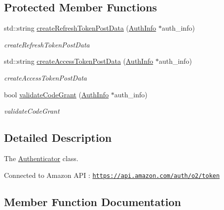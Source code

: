 \subsection*{Protected Member Functions}
\begin{DoxyCompactItemize}
\item 
std\+::string \hyperlink{classAuth_1_1Authenticator_a6b2064f905799b93b0f2bdb78fc99b19}{create\+Refresh\+Token\+Post\+Data} (\hyperlink{classAuth_1_1AuthInfo}{Auth\+Info} $\ast$auth\+\_\+info)
\begin{DoxyCompactList}\small\item\em create\+Refresh\+Token\+Post\+Data \end{DoxyCompactList}\item 
std\+::string \hyperlink{classAuth_1_1Authenticator_a295ebc69cf3ce17cb6ff0b6d8f8e4584}{create\+Access\+Token\+Post\+Data} (\hyperlink{classAuth_1_1AuthInfo}{Auth\+Info} $\ast$auth\+\_\+info)
\begin{DoxyCompactList}\small\item\em create\+Access\+Token\+Post\+Data \end{DoxyCompactList}\item 
bool \hyperlink{classAuth_1_1Authenticator_aeb9ff1428b63189a816d113f1dcdc4f1}{validate\+Code\+Grant} (\hyperlink{classAuth_1_1AuthInfo}{Auth\+Info} $\ast$auth\+\_\+info)
\begin{DoxyCompactList}\small\item\em validate\+Code\+Grant \end{DoxyCompactList}\end{DoxyCompactItemize}


\subsection{Detailed Description}
The \hyperlink{classAuth_1_1Authenticator}{Authenticator} class. 

Connected to Amazon A\+PI \+: \href{https://api.amazon.com/auth/o2/token}{\tt https\+://api.\+amazon.\+com/auth/o2/token} 

\subsection{Member Function Documentation}
\mbox{\label{classAuth_1_1Authenticator_a295ebc69cf3ce17cb6ff0b6d8f8e4584}} 
